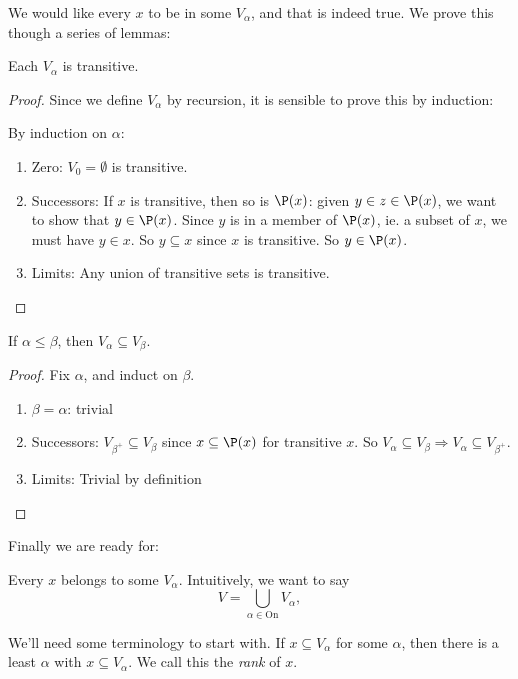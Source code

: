 \documentclass[a4paper]{article}
\begin{document}
We would like every $x$ to be in some $V_\alpha$, and that is indeed true. We prove this though a series of lemmas:

\begin{lemma}
  Each $V_\alpha$ is transitive.
\end{lemma}

\begin{proof}
  Since we define $V_\alpha$ by recursion, it is sensible to prove this by induction:

  By induction on $\alpha$:
  \begin{enumerate}
    \item Zero: $V_0 = \emptyset$ is transitive.
    \item Successors: If $x$ is transitive, then so is $\P(x)$: given $y\in z\in \P(x)$, we want to show that $y\in \P(x)$. Since $y$ is in a member of $\P(x)$, ie. a subset of $x$, we must have $y\in x$. So $y\subseteq x$ since $x$ is transitive. So $y\in \P(x)$.
    \item Limits: Any union of transitive sets is transitive.
  \end{enumerate}
\end{proof}

\begin{lemma}
  If $\alpha \leq \beta$, then $V_\alpha \subseteq V_\beta$.
\end{lemma}

\begin{proof}
  Fix $\alpha$, and induct on $\beta$.
  \begin{enumerate}
    \item $\beta = \alpha$: trivial
    \item Successors: $V_{\beta^+}\subseteq V_\beta$ since $x\subseteq \P(x)$ for transitive $x$. So $V_\alpha \subseteq V_\beta \Rightarrow V_\alpha \subseteq V_{\beta^+}$.
    \item Limits: Trivial by definition
  \end{enumerate}
\end{proof}

Finally we are ready for:
\begin{thm}
  Every $x$ belongs to some $V_\alpha$. Intuitively, we want to say
  \[
    V = \bigcup_{\alpha \in \mathrm{On}} V_\alpha,
  \]
\end{thm}
We'll need some terminology to start with. If $x\subseteq V_\alpha$ for some $\alpha$, then there is a least $\alpha$ with $x\subseteq V_\alpha$. We call this the \emph{rank} of $x$.
\end{document}
